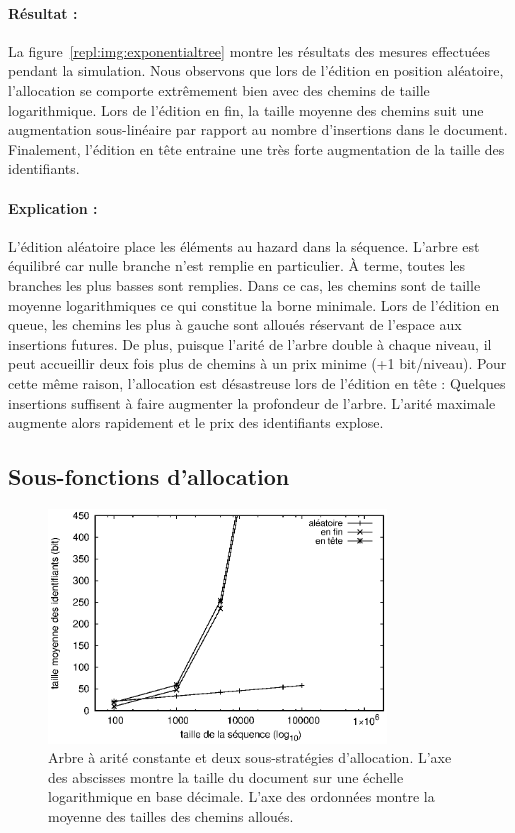 \paragraph{Résultat :} La figure~\ref{repl:img:exponentialtree} montre les
résultats des mesures effectuées pendant la simulation. Nous observons que lors
de l'édition en position aléatoire, l'allocation se comporte extrêmement bien
avec des chemins de taille logarithmique. Lors de l'édition en fin, la taille
moyenne des chemins suit une augmentation sous-linéaire par rapport au nombre
d'insertions dans le document. Finalement, l'édition en tête entraine une très
forte augmentation de la taille des identifiants.

\paragraph{Explication :} L'édition aléatoire place les éléments au hazard dans
la séquence. L'arbre est équilibré car nulle branche n'est remplie en
particulier. À terme, toutes les branches les plus basses sont remplies. Dans ce
cas, les chemins sont de taille moyenne logarithmiques ce qui constitue la borne
minimale. Lors de l'édition en queue, les chemins les plus à gauche sont alloués
réservant de l'espace aux insertions futures. De plus, puisque l'arité de
l'arbre double à chaque niveau, il peut accueillir deux fois plus de chemins à
un prix minime (+1 bit/niveau). Pour cette même raison, l'allocation est
désastreuse lors de l'édition en tête : Quelques insertions suffisent à faire
augmenter la profondeur de l'arbre. L'arité maximale augmente alors rapidement
et le prix des identifiants explose.


\subsection{Sous-fonctions d'allocation}

\begin{figure}
  \centering
  \includegraphics[width=0.8\textwidth]{img/lseq/robin.eps}
  \caption{\label{repl:img:suballocation} Arbre à arité constante et deux
    sous-stratégies d'allocation. L'axe des abscisses montre la taille du
    document sur une échelle logarithmique en base décimale. L'axe des ordonnées
    montre la moyenne des tailles des chemins alloués.}
\end{figure}

